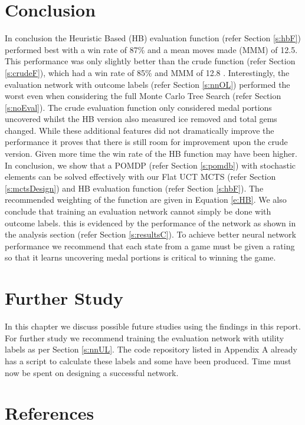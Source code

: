 \documentclass{bhamthesis}
\theoremstyle{definition}
\begin{document}
\chapter{Conclusion}
In conclusion the Heuristic Based (HB) evaluation function (refer Section \ref{s:hbF}) performed best with a win rate of 87\% and a mean moves made (MMM) of 12.5. This performance was only slightly better than the crude function (refer Section \ref{s:crudeF}), which had a win rate of 85\% and MMM of 12.8 . Interestingly, the evaluation network with outcome labels (refer Section \ref{s:nnOL}) performed the worst even when considering the full Monte Carlo Tree Search (refer Section \ref{s:noEval}).
The crude evaluation function only considered medal portions uncovered whilst the HB version also measured ice removed and total gems changed. While these additional features did not dramatically improve the performance it proves that there is still room for improvement upon the crude version. Given more time the win rate of the HB function may have been higher. 
In conclusion, we show that a POMDP (refer Section \ref{s:pomdb}) with stochastic elements can be solved effectively with our Flat UCT MCTS (refer Section \ref{s:mctsDesign}) and HB evaluation function (refer Section \ref{s:hbF}). The recommended weighting of the function are given in Equation \ref{e:HB}. We also conclude that training an evaluation network cannot simply be done with outcome labels. this is evidenced by the performance of the network as shown in the analysis section (refer Section \ref{s:resultsC}). To achieve better neural network performance we recommend that each state from a game must be given a rating so that it learns uncovering medal portions is critical to winning the game.

\chapter{Further Study}
In this chapter we discuss possible future studies using the findings in this report. 
For further study we recommend training the evaluation network with utility labels as per Section \ref{s:nnUL}. The code repository listed in Appendix A already has a script to calculate these labels and some have been produced. Time must now be spent on designing a successful network.


\backmatter
\chapter{References}
\printbibliography[heading=none]
%
%
\end{document}
